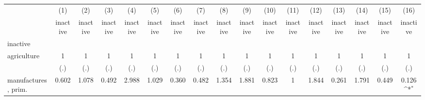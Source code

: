 {
\def\sym#1{\ifmmode^{#1}\else\(^{#1}\)\fi}
\begin{tabular}{l*{16}{c}}
\hline\hline
                    &\multicolumn{1}{c}{(1)}&\multicolumn{1}{c}{(2)}&\multicolumn{1}{c}{(3)}&\multicolumn{1}{c}{(4)}&\multicolumn{1}{c}{(5)}&\multicolumn{1}{c}{(6)}&\multicolumn{1}{c}{(7)}&\multicolumn{1}{c}{(8)}&\multicolumn{1}{c}{(9)}&\multicolumn{1}{c}{(10)}&\multicolumn{1}{c}{(11)}&\multicolumn{1}{c}{(12)}&\multicolumn{1}{c}{(13)}&\multicolumn{1}{c}{(14)}&\multicolumn{1}{c}{(15)}&\multicolumn{1}{c}{(16)}\\
                    &\multicolumn{1}{c}{inactive}&\multicolumn{1}{c}{inactive}&\multicolumn{1}{c}{inactive}&\multicolumn{1}{c}{inactive}&\multicolumn{1}{c}{inactive}&\multicolumn{1}{c}{inactive}&\multicolumn{1}{c}{inactive}&\multicolumn{1}{c}{inactive}&\multicolumn{1}{c}{inactive}&\multicolumn{1}{c}{inactive}&\multicolumn{1}{c}{inactive}&\multicolumn{1}{c}{inactive}&\multicolumn{1}{c}{inactive}&\multicolumn{1}{c}{inactive}&\multicolumn{1}{c}{inactive}&\multicolumn{1}{c}{inactive}\\
\hline
inactive            &                     &                     &                     &                     &                     &                     &                     &                     &                     &                     &                     &                     &                     &                     &                     &                     \\
agriculture         &           1         &           1         &           1         &           1         &           1         &           1         &           1         &           1         &           1         &           1         &           1         &           1         &           1         &           1         &           1         &           1         \\
                    &         (.)         &         (.)         &         (.)         &         (.)         &         (.)         &         (.)         &         (.)         &         (.)         &         (.)         &         (.)         &         (.)         &         (.)         &         (.)         &         (.)         &         (.)         &         (.)         \\
[1em]
manufactures, prim. &       0.602         &       1.078         &       0.492         &       2.988         &       1.029         &       0.360         &       0.482         &       1.354         &       1.881         &       0.823         &           1         &       1.844         &       0.261         &       1.791         &       0.449         &       0.126\sym{*}  \\

\end{tabular}}
